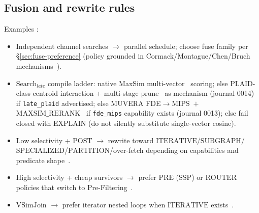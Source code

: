 \subsection{Fusion and rewrite rules}
Examples \hypothesis{}:
\begin{itemize}
  \item Independent channel searches $\rightarrow$ parallel schedule; choose fuse family per \S\ref{sec:fuse-preference} \hypothesis{} (policy grounded in Cormack/Montague/Chen/Bruch mechanisms~\citep{cormack2009rrf,montague2002condorcet,chen2022ood,bruch2023fusion}).
  \item \(\mathrm{Search}_{late}\) compile ladder: native MaxSim multi-vector~\citep{khattab2020colbert} \established{} scoring;
    else PLAID-class centroid interaction + multi-stage prune~\citep{santhanam2022plaid} \established{} as mechanism (journal 0014) if \texttt{late\_plaid} advertised;
    else MUVERA FDE$\rightarrow$MIPS~$+$~$\mathrm{MAXSIM\_RERANK}$~\citep{jayaram2024muvera} if \texttt{fde\_mips} capability exists (journal 0013);
    else fail closed with EXPLAIN (do not silently substitute single-vector cosine).
  \item Low selectivity + $\mathrm{POST}$ $\rightarrow$ rewrite toward $\mathrm{ITERATIVE}$/$\mathrm{SUBGRAPH}$/$\mathrm{SPECIALIZED}$/$\mathrm{PARTITION}$/over-fetch depending on capabilities and predicate shape~\citep{lin2025fanns,patel2024acorn}.
  \item High selectivity + cheap survivors $\rightarrow$ prefer $\mathrm{PRE}$ (SSP) or $\mathrm{ROUTER}$ policies that switch to Pre-Filtering~\citep{lin2025fanns}.
  \item $\mathrm{VSimJoin}$ $\rightarrow$ prefer iterator nested loops when $\mathrm{ITERATIVE}$ exists~\citep{zhang2023vbase}.
\end{itemize}

